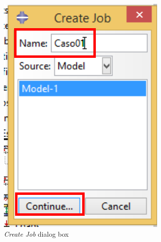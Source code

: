 \begin{figure}[!h]
\begin{subfigure}[!h]{0.32\textwidth}
      \includegraphics[width=\textwidth]{./body/images/job02.pdf}
      \caption{\textit{Create Job} dialog box}
      \label{job02}
    \end{subfigure}%
    ~
    \begin{subfigure}[!h]{0.44\textwidth}

\end{subfigure}
\end{figure}
